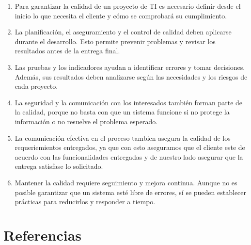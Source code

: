 \documentclass[12pt]{article}
\begin{document}
\begin{enumerate}
    \item Para garantizar la calidad de un proyecto de TI es necesario definir
    desde el inicio lo que necesita el cliente y cómo se comprobará su
    cumplimiento.

    \item La planificación, el aseguramiento y el control de calidad deben
    aplicarse durante el desarrollo. Esto permite prevenir problemas y
    revisar los resultados antes de la entrega final.

    \item Las pruebas y los indicadores ayudan a identificar errores y tomar
    decisiones. Además, sus resultados deben analizarse según las
    necesidades y los riesgos de cada proyecto.

    \item La seguridad y la comunicación con los interesados también forman
    parte de la calidad, porque no basta con que un sistema funcione si no
    protege la información o no resuelve el problema esperado.
	
	\item La comunicación efectiva en el proceso tambien asegura la calidad de los requeriemientos entregados, ya que con esto aseguramos que el cliente este de acuerdo con las funcionalidades entregadas y de nuestro lado asegurar que la  entrega satisfase lo solicitado.
	
    \item Mantener la calidad requiere seguimiento y mejora continua. Aunque
    no es posible garantizar que un sistema esté libre de errores, sí se
    pueden establecer prácticas para reducirlos y responder a tiempo.
\end{enumerate}

\section*{Referencias}
\end{document}
